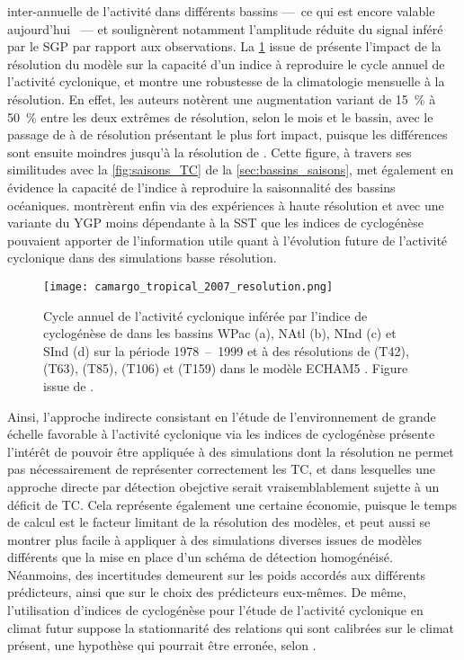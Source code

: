 \documentclass[../main.tex]{subfiles}
\begin{document}
inter-annuelle de l'activité dans différents bassins ---~ce qui est encore valable aujourd'hui \parencite{camargo_tropical_2007,camargo_tropical_2016}~--- et
soulignèrent notamment l'amplitude réduite du signal inféré par le SGP par rapport aux observations. La \cref{fig:GP_resolution} issue de
\cite{camargo_tropical_2007} présente l'impact de la résolution du modèle sur la capacité d'un indice à reproduire le cycle annuel de l'activité cyclonique, et
montre une robustesse de la climatologie mensuelle à la résolution. En effet, les auteurs notèrent une augmentation variant de \SI{15}{\percent} à
\SI{50}{\percent} entre les deux extrêmes de résolution, selon le mois et le bassin, avec le passage de  à  de résolution présentant le plus
fort impact, puisque les différences sont ensuite moindres jusqu'à la résolution de . Cette figure, à travers ses similitudes avec la
\cref{fig:saisons_TC} de la \cref{sec:bassins_saisons}, met également en évidence la capacité de l'indice à reproduire la saisonnalité des bassins océaniques.
\cite{mcdonald_tropical_2005,chauvin_response_2006} montrèrent enfin via des expériences à haute résolution et avec une variante du YGP moins dépendante à la
SST que les indices de cyclogénèse pouvaient apporter de l'information utile quant à l'évolution future de l'activité cyclonique dans des simulations basse
résolution.

\begin{figure}[tb]
    \centering
    \texttt{[image: camargo\_tropical\_2007\_resolution.png]}
    \caption{Cycle annuel de l'activité cyclonique inférée par l'indice de cyclogénèse de \cite{emanuel_tropical_2004} dans les bassins WPac (a), NAtl (b), NInd
    (c) et SInd (d) sur la période \num{1978}~--~\num{1999} et à des résolutions de  (T42),  (T63),  (T85),  (T106) et 
    (T159) dans le modèle ECHAM5 \parencite{roeckner_atmospheric_2003}. Figure issue de \cite{camargo_tropical_2007}.}
    \label{fig:GP_resolution}
\end{figure}

Ainsi, l'approche indirecte consistant en l'étude de l'environnement de grande échelle favorable à l'activité cyclonique via les indices de cyclogénèse présente
l'intérêt de pouvoir être appliquée à des simulations dont la résolution ne permet pas nécessairement de représenter correctement les TC, et dans lesquelles une
approche directe par détection obejctive serait vraisemblablement sujette à un déficit de TC. Cela représente également une certaine économie, puisque le temps de
calcul est le facteur limitant de la résolution des modèles, et peut aussi se montrer plus facile à appliquer à des simulations diverses issues de modèles
différents que la mise en place d'un schéma de détection homogénéisé. Néanmoins, des incertitudes demeurent sur les poids accordés aux différents prédicteurs,
ainsi que sur le choix des prédicteurs eux-mêmes. De même, l'utilisation d'indices de cyclogénèse pour l'étude de l'activité cyclonique en climat futur suppose
la stationnarité des relations qui sont calibrées sur le climat présent, une hypothèse qui pourrait être erronée, selon
\textcite{nolan_increased_2008,murakami_changes_2013}.
\end{document}
